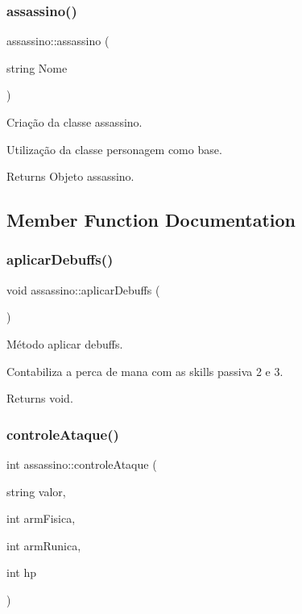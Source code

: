 \subsubsection{\texorpdfstring{assassino()}{assassino()}}
{\footnotesize\ttfamily assassino\+::assassino (\begin{DoxyParamCaption}\item[{string}]{Nome }\end{DoxyParamCaption})}



Criação da classe assassino. 

Utilização da classe personagem como base. \begin{DoxyReturn}{Returns}
Objeto assassino. 
\end{DoxyReturn}


\subsection{Member Function Documentation}
\mbox{\label{classassassino_a283e61020246d2bec61fe8e661a412e9}} 
\subsubsection{\texorpdfstring{aplicar\+Debuffs()}{aplicarDebuffs()}}
{\footnotesize\ttfamily void assassino\+::aplicar\+Debuffs (\begin{DoxyParamCaption}{ }\end{DoxyParamCaption})}



Método aplicar debuffs. 

Contabiliza a perca de mana com as skills passiva 2 e 3. \begin{DoxyReturn}{Returns}
void. 
\end{DoxyReturn}
\mbox{\label{classassassino_a3f46fb60f6617502542fe7377a6499ab}} 
\subsubsection{\texorpdfstring{controle\+Ataque()}{controleAtaque()}}
{\footnotesize\ttfamily int assassino\+::controle\+Ataque (\begin{DoxyParamCaption}\item[{string}]{valor,  }\item[{int}]{arm\+Fisica,  }\item[{int}]{arm\+Runica,  }\item[{int}]{hp }\end{DoxyParamCaption})}



